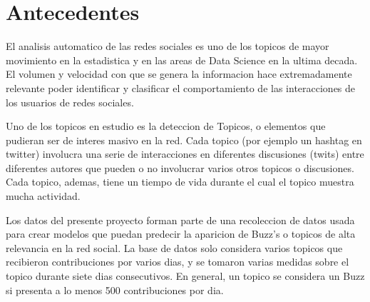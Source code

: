 \section{Antecedentes}

El analisis automatico de las redes sociales es uno de los topicos de
mayor movimiento en la estadistica y en las areas de Data Science en
la ultima decada. El volumen y velocidad con que se genera la
informacion hace extremadamente relevante poder identificar y
clasificar el comportamiento de las interacciones de los usuarios de
redes sociales.

Uno de los topicos en estudio es la deteccion de Topicos, o elementos
que pudieran ser de interes masivo en la red. Cada topico (por
ejemplo un hashtag en twitter) involucra una serie de interacciones
en diferentes discusiones (twits) entre diferentes autores que pueden
o no involucrar varios otros topicos o discusiones. Cada topico,
ademas, tiene un tiempo de vida durante el cual el topico muestra
mucha actividad.

Los datos del presente proyecto forman parte de una recoleccion de
datos usada para crear modelos que puedan predecir la aparicion de
Buzz's o topicos de alta relevancia en la red social. La base de
datos solo considera varios topicos que recibieron contribuciones por
varios dias, y se tomaron varias medidas sobre el topico durante
siete dias consecutivos. En general, un topico se considera un Buzz
si presenta a lo menos 500 contribuciones por dia.
